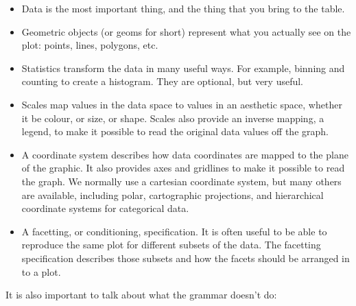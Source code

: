 \begin{itemize}
	\item Data is the most important thing, and the thing that you bring to the table.
	\item Geometric objects (or geoms for short) represent what you actually see on the plot: points, lines, polygons, etc.
	\item Statistics transform the data in many useful ways.  For example, binning and counting to create a histogram.  They are optional, but very useful.
	\item Scales map values in the data space to values in an aesthetic space, whether it be colour, or size, or shape.  Scales also provide an inverse mapping, a legend, to make it possible to read the original data values off the graph.
	\item A coordinate system describes how data coordinates are mapped to the plane of the graphic.  It also provides axes and gridlines to make it possible to read the graph.  We normally use a cartesian coordinate system, but many others are available, including polar, cartographic projections, and hierarchical coordinate systems for categorical data.
	\item A facetting, or conditioning, specification.  It is often useful to be able to reproduce the same plot for different subsets of the data.  The facetting specification describes those subsets and how the facets should be arranged in to a plot.
\end{itemize}

It is also important to talk about what the grammar doesn't do:


